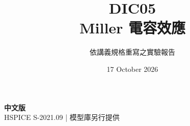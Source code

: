 \documentclass[11pt,a4paper]{article}
\title{\color{accent}DIC05\\[4pt]Miller 電容效應}
\author{依講義規格重寫之實驗報告}
\date{17 October 2026}
\begin{document}
\maketitle
\begin{center}\small\textbf{中文版}\\
HSPICE S-2021.09 \quad | \quad 模型庫另行提供
\end{center}


\end{document}
